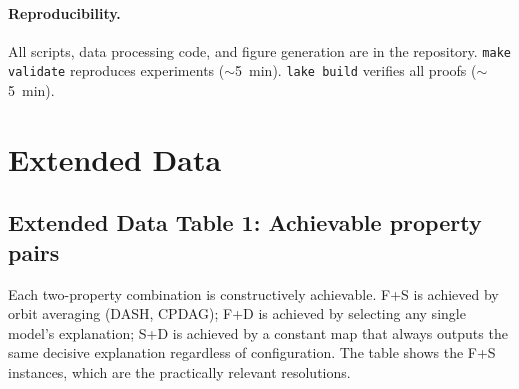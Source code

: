 \documentclass[11pt]{article}
\begin{document}
\paragraph{Reproducibility.}
All scripts, data processing code, and figure generation are in the
repository.  \texttt{make validate} reproduces experiments ($\sim$5~min).
\texttt{lake build} verifies all proofs ($\sim$5~min).


\clearpage
\section*{Extended Data}

\subsection*{Extended Data Table 1: Achievable property pairs}

Each two-property combination is constructively achievable.
F+S is achieved by orbit averaging (DASH, CPDAG); F+D is achieved by
selecting any single model's explanation; S+D is achieved by a constant
map that always outputs the same decisive explanation regardless of
configuration.  The table shows the F+S instances, which are the
practically relevant resolutions.
\end{document}
